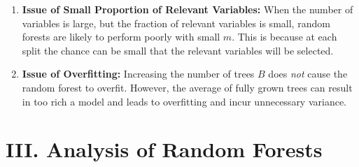 \documentclass[12pt]{article}
\begin{document}
\begin{enumerate}[label=\textbf{\arabic*.}]
\begin{enumerate}
	\end{enumerate}
	
	\item \textbf{Issue of Small Proportion of Relevant Variables:} When the number of variables is large, but the fraction of relevant variables is small, random forests are likely to perform poorly with small $m$. This is because at each split the chance can be small that the relevant variables will be selected. 
	
	\item \textbf{Issue of Overfitting:} Increasing the number of trees $B$ does \emph{not} cause the random forest to overfit. However, the average of fully grown trees can result in too rich a model and leads to overfitting and incur unnecessary variance. 
		
\end{enumerate}


\section*{III. Analysis of Random Forests}
\end{document}

